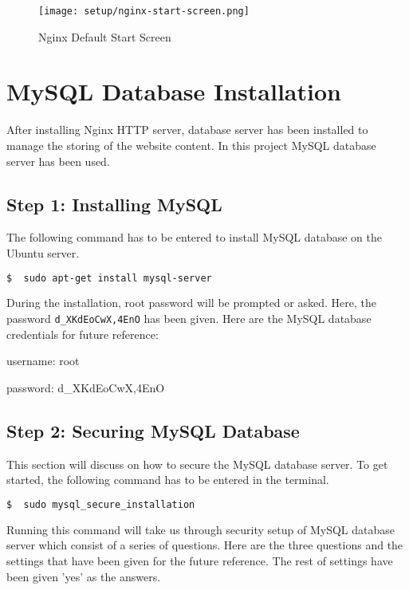 \begin{figure}[ht]
\caption{Nginx Default Start Screen}
\label{fig:nginx-start-screen}
\centering
\texttt{[image: setup/nginx-start-screen.png]}
\end{figure}


\section{MySQL Database Installation} \label{sec:mysql-database-installation}
After installing Nginx HTTP server, database server has been installed to manage the storing of the website content. In this project MySQL database server has been used.

\subsection*{Step 1: Installing MySQL}
The following command has to be entered to install MySQL database on the Ubuntu server. 
\begin{lstlisting}[language=sh]
$  sudo apt-get install mysql-server
\end{lstlisting}

During the installation, root password will be prompted or asked. Here, the password \texttt{d\_XKdEoCwX,4EnO} has been given. Here are the MySQL database credentials for future reference:
\begin{itemize*}
\item username: root
\item password: d\_XKdEoCwX,4EnO
\end{itemize*}

\subsection*{Step 2: Securing MySQL Database}
This section will discuss on how to secure the MySQL database server. To get started, the following command has to be entered in the terminal.
\begin{lstlisting}[language=sh]
$  sudo mysql_secure_installation
\end{lstlisting}

Running this command will take us through security setup of MySQL database server which consist of a series of questions. Here are the three questions and the settings that have been given for the future reference. The rest of settings have been given 'yes' as the answers.

